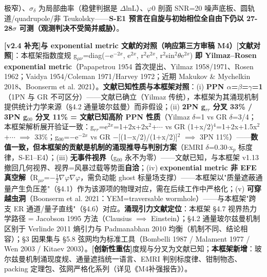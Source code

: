 \documentclass[12pt]{article}
\newcommand{\mtag}[1]{\textbf{[#1]}}
\newcommand{\up}[1]{\ensuremath{^{#1}}}
\newcommand{\down}[1]{\ensuremath{_{#1}}}
\begin{document}
极窄）、\ensuremath{\sigma}\down{\delta{}} 为局部曲率（稳健判据是 \ensuremath{\Delta}lnL）、\ensuremath{\varphi}0 剖面 SNR=20 噪声底板、圆轨道/quadrupole/非 Teukolsky------\textbf{S-E1 预言在自旋与初始相位全自由下仍以 27-28\ensuremath{\sigma} 可测（观测判决不受简并威胁）}。

\textbf{\mtag{v2.4 补充}与 exponential metric 文献的对照（响应第三方审稿 M4）}\mtag{文献对照}：本框架指数度规 g\down{\mu{}\nu{}}=diag(\ensuremath{-}e\up{-2x}, e\up{2x}, r\up{2}e\up{2x}, r\up{2}sin\up{2}\ensuremath{\theta}e\up{2x}) \textbf{即 Yilmaz--Rosen exponential metric}（Papapetrou 1954 首次提出、Yilmaz 1958/1971、Rosen 1962；Vaidya 1954/Coleman 1971/Harvey 1972；近期 Makukov \& Mychelkin 2018、Boonserm et al. 2021）。\textbf{文献已知性质与本框架对照}：(i) \textbf{PPN \ensuremath{\alpha}=\ensuremath{\beta}=\ensuremath{\gamma}=1}（1PN 与 GR 不可区分）------文献已确立（Yilmaz 传统），本框架为其涌现机制提供统计力学来源（\S{}4.2 通量玻尔兹曼）而非假设；(ii) \textbf{2PN g\down{rr} 分叉 33\% / 3PN g\down{00} 分叉 11\% = 文献已知高阶 PPN 性质}（Yilmaz \ensuremath{\delta}=1 vs GR \ensuremath{\delta}=3/4；本框架解析展开验证一致：g\down{rr}=e\up{2x}=1+2x+2x\up{2}+\ensuremath{\cdots} vs GR (1+x/2)\up{4}=1+2x+1.5x\up{2}+\ensuremath{\cdots} \ensuremath{\implies} 33\%；g\down{00}=\ensuremath{-}e\up{-2x} vs GR \ensuremath{-}[(1\ensuremath{-}x/2)/(1+x/2)]\up{2} \ensuremath{\implies} 3PN 11\%）------\textbf{数值一致，但本框架的贡献是机制的涌现推导与判别方案}（EMRI \ensuremath{\delta}=0.30\ensuremath{\cdot}x\down{p} 标度律，S-E1--E4）；(iii) \textbf{无事件视界}（g\down{00} 永不为零）------文献已知，与本框架 v1.13 撤回几何视界、视界=风暴过载等势面\textbf{自洽}；(iv) \textbf{exponential metric 非 EFE 真空解}（R\down{\mu{}\nu{}}=\ensuremath{-}\ensuremath{\tfrac12}\ensuremath{\nabla}\ensuremath{\varphi}\ensuremath{\nabla}\ensuremath{\varphi}，需负动能 ghost 标量场支撑）------本框架以"质量遮蔽通量产生负压差"（\S{}4.1）作为该源项的物理对应，需在后续工作中严格化；(v) \textbf{可穿越虫洞}（Boonserm et al. 2021：YEM=traversable wormhole）------与本框架"跨支 ER 通道/量子直线"（\S{}4.6）对应。\textbf{涌现引力文献定位}：本框架 \S{}4.7 视界热力学路径 = Jacobson 1995 方法（Clausius \ensuremath{\implies} Einstein）；\S{}4.2 通量玻尔兹曼机制区别于 Verlinde 2011 熵引力与 Padmanabhan 2010 均衡（机制不同、结论相容）；\S{}3 因果集与 \S{}5.8 弦网均为标准工具（Bombelli 1987 / Malament 1977 / Wen 2003 / Kitaev 2003）。\mtag{创新性重估}度规与分叉为文献已知；\textbf{本框架新增}：玻尔兹曼机制涌现度规、通量遮挡统一语言、EMRI 判别标度律、钳制物态、packing 定理包、弦网严格化系列（详见《M4补强报告》）。
\end{document}
